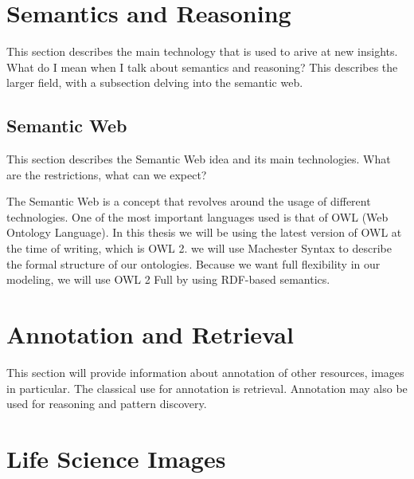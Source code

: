 \section{Semantics and Reasoning}

This section describes the main technology that is used to arive at
new insights. What do I mean when I talk about semantics and
reasoning? This describes the larger field, with a subsection delving
into the semantic web.


\subsection{Semantic Web}

This section describes the Semantic Web idea and its main
technologies. What are the restrictions, what can we expect?

The Semantic Web is a concept that revolves around the usage of
different technologies. One of the most important languages used is
that of OWL (Web Ontology Language). In this thesis we will be using
the latest version of OWL at the time of writing, which is OWL 2. we
will use Machester Syntax to describe the formal structure of our
ontologies. Because we want full flexibility in our modeling, we will
use OWL 2 Full by using RDF-based semantics.




\section{Annotation and Retrieval}

This section will provide information about annotation of other
resources, images in particular. The classical use for annotation is
retrieval. Annotation may also be used for reasoning and pattern
discovery.


\section{Life Science Images}


